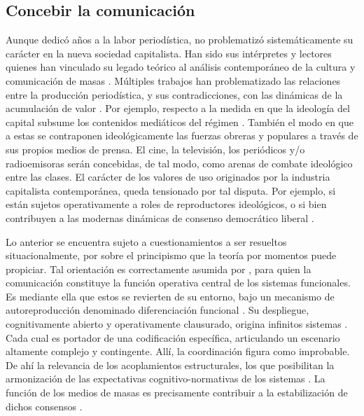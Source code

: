 \documentclass{textolivre}
\begin{document}
\subsection{Concebir la comunicación}\label{sec-concebir}
Aunque dedicó años a la labor periodística, \textcite{marx2013} no problematizó
sistemáticamente su carácter en la nueva sociedad capitalista. Han sido sus intérpretes y
lectores quienes han vinculado su legado teórico al análisis contemporáneo de la cultura y
comunicación de masas \cite{mosco2016}. Múltiples trabajos han problematizado
las relaciones entre la producción periodística, y sus contradicciones, con las dinámicas
de la acumulación de valor \cite{Santander2014}. Por ejemplo, respecto a la medida en
que la ideología del capital subsume los contenidos mediáticos del régimen
\cite{sapiezynska2013}. También el modo en que a estas se
contraponen ideológicamente las fuerzas obreras y populares a través de sus propios
medios de prensa. El cine, la televisión, los periódicos y/o radioemisoras serán
concebidas, de tal modo, como arenas de combate ideológico entre las clases. El carácter
de los valores de uso originados por la industria capitalista contemporánea, queda
tensionado por tal disputa. Por ejemplo, si están sujetos operativamente a roles de
reproductores ideológicos, o si bien contribuyen a las modernas dinámicas de consenso
democrático liberal \cite{Habermas2006}.

Lo anterior se encuentra sujeto a cuestionamientos a ser resueltos
situacionalmente, por sobre el principismo que la teoría por momentos puede propiciar. Tal
orientación es correctamente asumida por \textcite{Luhmann1991}, para quien la comunicación
constituye la función operativa central de los sistemas funcionales. Es mediante ella que
estos se revierten de su entorno, bajo un mecanismo de autoreproducción denominado
diferenciación funcional \cite{Tkke2010}. Su despliegue, cognitivamente
abierto y operativamente clausurado, origina infinitos sistemas \cite{billi2017}. 
Cada cual es portador de una codificación específica, articulando un escenario
altamente complejo y contingente. Allí, la coordinación figura como improbable. De ahí la
relevancia de los acoplamientos estructurales, los que posibilitan la armonización de las
expectativas cognitivo-normativas de los sistemas \cite{Luhmann2007}. La función de los
medios de masas es precisamente contribuir a la estabilización de dichos consensos
\cite{becerra2013}.
\end{document}
